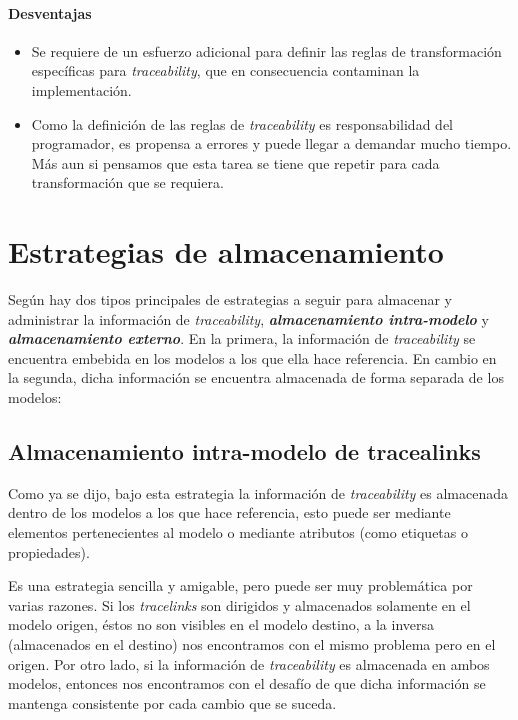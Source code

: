 \documentclass[a4paper,12pt,oneside,spanish]{book}
\begin{document}
\paragraph{Desventajas}

\begin{itemize}[label={$\times$}]

\item Se requiere de un esfuerzo adicional para definir las reglas de transformación específicas para \textit{traceability}, que en consecuencia contaminan la implementación.

\item Como la definición de las reglas de \textit{traceability} es responsabilidad del programador, es propensa a errores y puede llegar a demandar mucho tiempo. Más aun si pensamos que esta tarea se tiene que repetir para cada transformación que se requiera.

\end{itemize}


\section{Estrategias de almacenamiento}

Según \cite{DrivalosPaigeFernandesKolovos} hay dos tipos principales de estrategias a seguir para almacenar y administrar la información de \textit{traceability}, \textit{\textbf{almacenamiento intra-modelo}} y \textit{\textbf{almacenamiento externo}}. En la primera, la información de \textit{traceability} se encuentra embebida en los modelos a los que ella hace referencia. En cambio en la segunda, dicha información se encuentra almacenada de forma separada de los modelos:

\subsection{Almacenamiento intra-modelo de tracealinks}

Como ya se dijo, bajo esta estrategia la información de \textit{traceability} es almacenada dentro de los modelos a los que hace referencia, esto puede ser mediante elementos pertenecientes al modelo o mediante atributos (como etiquetas o propiedades).

Es una estrategia sencilla y amigable, pero puede ser muy problemática por varias razones. Si los \textit{tracelinks} son dirigidos y almacenados solamente en el modelo origen, éstos no son visibles en el modelo destino, a la inversa (almacenados en el destino) nos encontramos con el mismo problema pero en el origen. Por otro lado, si la información de \textit{traceability} es almacenada en ambos modelos, entonces nos encontramos con el desafío de que dicha información se mantenga consistente por cada cambio que se suceda.
\end{document}
